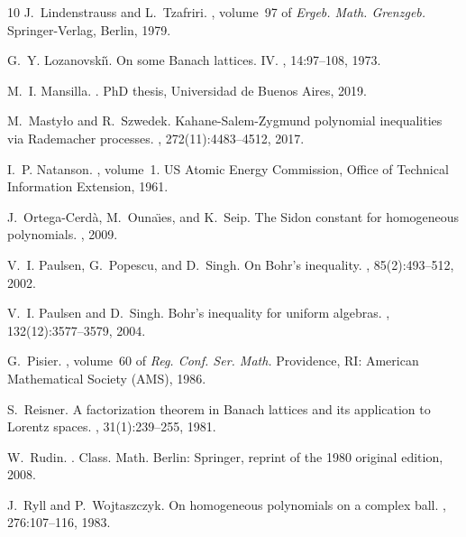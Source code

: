 \documentclass[12pt]{amsart}
\numberwithin{subsection}{section}
\theoremstyle{definition}
\theoremstyle{remark}
\begin{document}
\begin{thebibliography}{10}
J.~Lindenstrauss and L.~Tzafriri.
, volume~97 of {\em Ergeb. Math. Grenzgeb.}
\newblock Springer-Verlag, Berlin, 1979.

G.~Y. Lozanovski\v{\i}.
\newblock On some {Banach} lattices. {IV}.
, 14:97--108, 1973.

M.~I. Mansilla.
.
\newblock PhD thesis, Universidad de Buenos Aires, 2019.

M.~Masty{\l}o and R.~Szwedek.
\newblock Kahane-{Salem}-{Zygmund} polynomial inequalities via {Rademacher} processes.
, 272(11):4483--4512, 2017.

I.~P. Natanson.
, volume~1.
\newblock US Atomic Energy Commission, Office of Technical Information Extension, 1961.

J.~Ortega-Cerd{\`a}, M.~Ouna{\"\i}es, and K.~Seip.
\newblock The {S}idon constant for homogeneous polynomials.
, 2009.

V.~I. Paulsen, G.~Popescu, and D.~Singh.
\newblock On {Bohr}'s inequality.
, 85(2):493--512, 2002.

V.~I. Paulsen and D.~Singh.
\newblock Bohr's inequality for uniform algebras.
, 132(12):3577--3579, 2004.

G.~Pisier.
, volume~60 of {\em Reg. Conf. Ser. Math.}
\newblock Providence, RI: American Mathematical Society (AMS), 1986.

S.~Reisner.
\newblock A factorization theorem in {Banach} lattices and its application to {Lorentz} spaces.
, 31(1):239--255, 1981.

W.~Rudin.
.
\newblock Class. Math. Berlin: Springer, reprint of the 1980 original edition, 2008.

J.~Ryll and P.~Wojtaszczyk.
\newblock On homogeneous polynomials on a complex ball.
, 276:107--116, 1983.


\end{thebibliography}
\end{document}
